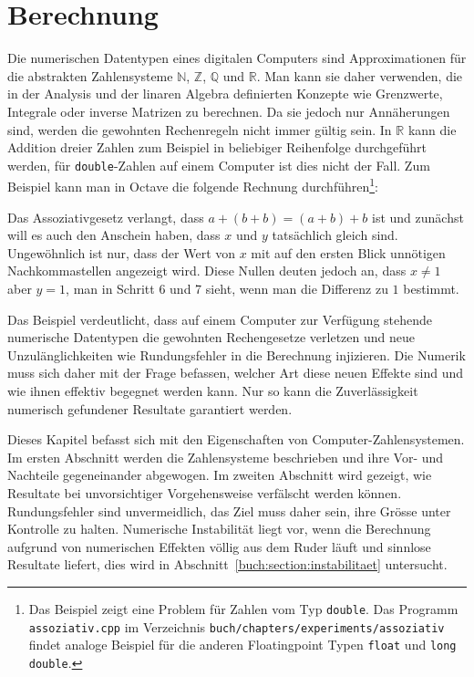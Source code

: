 %
%
%
\chapter{Berechnung
\label{chapter:berechnung}}
\rhead{}
Die numerischen Datentypen eines digitalen Computers sind Approximationen
für die abstrakten Zahlensysteme $\mathbb{N}$, $\mathbb{Z}$, $\mathbb{Q}$
und $\mathbb{R}$.
Man kann sie daher verwenden, die in der Analysis und der linaren Algebra
definierten Konzepte wie Grenzwerte, Integrale oder inverse Matrizen zu
berechnen.
Da sie jedoch nur Annäherungen sind, werden die gewohnten Rechenregeln 
nicht immer gültig sein.
In $\mathbb{R}$ kann die Addition dreier Zahlen zum Beispiel in beliebiger
Reihenfolge durchgeführt werden, für \texttt{double}-Zahlen auf einem
Computer ist dies nicht der Fall.
Zum Beispiel kann man in Octave die folgende Rechnung durchführen\footnote{%
Das Beispiel zeigt eine Problem für Zahlen vom Typ \texttt{double}.
Das Programm \texttt{assoziativ.cpp} im Verzeichnis
\texttt{buch/chapters/experiments/assoziativ} findet analoge Beispiel für
die anderen Floatingpoint Typen \texttt{float} und \texttt{long double}.}:

Das Assoziativgesetz verlangt, dass $a+(b+b)=(a+b)+b$ ist und zunächst
will es auch den Anschein haben, dass $x$ und $y$ tatsächlich gleich sind.
Ungewöhnlich ist nur, dass der Wert von $x$ mit auf den ersten Blick
unnötigen Nachkommastellen angezeigt wird.
Diese Nullen deuten jedoch an, dass $x\ne 1$ aber $y=1$, man in Schritt
6 und 7 sieht, wenn man die Differenz zu $1$ bestimmt.

Das Beispiel verdeutlicht, dass auf einem Computer zur Verfügung
stehende numerische Datentypen die gewohnten Rechengesetze verletzen und
neue Unzulänglichkeiten wie Rundungsfehler in die Berechnung injizieren.
Die Numerik muss sich daher mit der Frage befassen, welcher Art diese
neuen Effekte sind und wie ihnen effektiv begegnet werden kann.
Nur so kann die Zuverlässigkeit numerisch gefundener Resultate
garantiert werden.

Dieses Kapitel befasst sich mit den Eigenschaften von Computer-Zahlensystemen.
Im ersten Abschnitt werden die Zahlensysteme beschrieben und ihre 
Vor- und Nachteile gegeneinander abgewogen.
Im zweiten Abschnitt wird gezeigt, wie Resultate bei unvorsichtiger
Vorgehensweise verfälscht werden können.
Rundungsfehler sind unvermeidlich, das Ziel muss daher sein, ihre
Grösse unter Kontrolle zu halten.
Numerische Instabilität liegt vor, wenn die Berechnung aufgrund von
numerischen Effekten völlig aus dem Ruder läuft und sinnlose Resultate
liefert, dies wird in Abschnitt~\ref{buch:section:instabilitaet}
untersucht.


